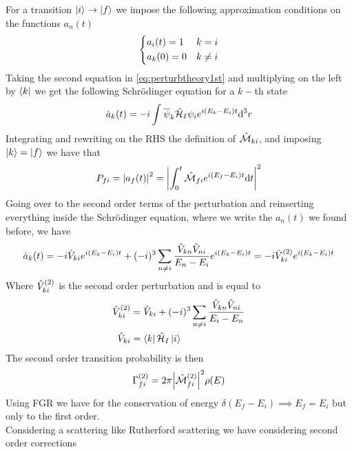 \documentclass[../qm.tex]{subfiles}
\begin{document}
For a transition $\ket{i}\to\ket{f}$ we impose the following approximation conditions on the functions $a_n(t)$
\begin{equation}
	\begin{dcases}
		a_i(t)=1&k=i\\
		a_k(0)=0&k\ne i\\
	\end{dcases}
	\label{eq:approxcases}
\end{equation}
Taking the second equation in \eqref{eq:perturbtheory1st} and multiplying on the left by $\bra{k}$ we get the following Schrödinger equation for a $k-$th state
\begin{equation}
	\dot{a}_k(t)=-i\int_{}^{}\overline{\psi}_k\hat{\mathcal{H}}_I\psi_ie^{i(E_k-E_i)t}\dd^3r
	\label{eq:trans1stpert}
\end{equation}
Integrating and rewriting on the RHS the definition of $\hat{\mathcal{M}}_{ki}$, and imposing $\ket{k}=\ket{f}$ we have that
\begin{equation}
	P_{fi}=\abs{a_f(t)}^2=\abs{\int_{0}^{t}\hat{\mathcal{M}}_{fi}e^{i(E_f-E_i)t}\dd t}^2
	\label{eq:transprob1stqft}
\end{equation}
Going over to the second order terms of the perturbation and reinserting everything inside the Schrödinger equation, where we write the $a_n(t)$ we found before, we have
\begin{equation}
	\dot{a}_k(t)=-i\hat{V}_{ki}e^{i(E_k-E_i)t}+(-i)^3\sum_{n\ne i}\frac{\hat{V}_{kn}\hat{V}_{ni}}{E_n-E_i}e^{i(E_k-E_i)t}=-i\hat{V}_{ki}^{(2)}e^{i(E_k-E_i)t}
	\label{eq:secondorderpertqft}
\end{equation}
Where $\hat{V}_{ki}^{(2)}$ is the second order perturbation and is equal to
\begin{equation}
	\begin{aligned}
		\hat{V}_{ki}^{(2)}&=\hat{V}_{ki}+(-i)^3\sum_{n\ne i}\frac{\hat{V}_{kn}\hat{V}_{ni}}{E_i-E_n}\\
		\hat{V}_{ki}&=\bra{k}\hat{\mathcal{H}}_I\ket{i}
	\end{aligned}
	\label{eq:pertV}
\end{equation}
The second order transition probability is then
\begin{equation}
	\Gamma^{(2)}_{fi}=2\pi\abs{\hat{\mathcal{M}}_{fi}^{(2)}}^2\rho(E)
	\label{eq:trans2ordqft}
\end{equation}
Using FGR we have for the conservation of energy $\delta(E_f-E_i)\implies{}E_f=E_i$ but only to the first order.\\
Considering a scattering like Rutherford scattering we have considering second order corrections
\end{document}
